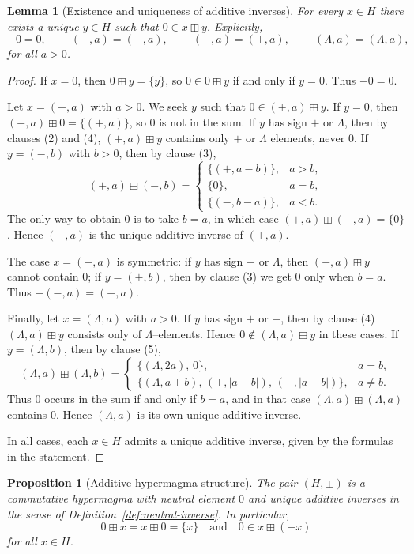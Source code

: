 \documentclass[11pt]{amsart}
\numberwithin{equation}{section}
\newtheorem{proposition}[theorem]{Proposition}
\newtheorem{lemma}[theorem]{Lemma}
\theoremstyle{definition}
\theoremstyle{remark}
\newcommand{\Hnum}{H}                      %
\newcommand{\op}{\boxplus}                 %
\begin{document}
\begin{lemma}[Existence and uniqueness of additive inverses]\label{lem:H-add-inverses}
For every $x\in\Hnum$ there exists a unique $y\in\Hnum$ such that
$0\in x\op y$.  Explicitly,
\[
  -0 = 0,\quad
  -(+,a) = (-,a),\quad
  -(-,a) = (+,a),\quad
  -(\Lambda,a) = (\Lambda,a),
\]
for all $a>0$.
\end{lemma}

\begin{proof}
If $x=0$, then $0\op y=\{y\}$, so $0\in0\op y$ if and only if $y=0$.
Thus $-0=0$.

Let $x=(+,a)$ with $a>0$.  We seek $y$ such that $0\in(+,a)\op y$.
If $y=0$, then $(+,a)\op0=\{(+,a)\}$, so $0$ is not in the sum.  If
$y$ has sign $+$ or $\Lambda$, then by clauses (2) and (4),
$(+,a)\op y$ contains only $+$ or $\Lambda$ elements, never $0$.  If
$y=(-,b)$ with $b>0$, then by clause (3),
\[
  (+,a)\op(-,b)
  =
  \begin{cases}
    \{(+,a-b)\}, & a>b,\\[2pt]
    \{0\},       & a=b,\\[2pt]
    \{(-,b-a)\}, & a<b.
  \end{cases}
\]
The only way to obtain $0$ is to take $b=a$, in which case
$(+,a)\op(-,a)=\{0\}$.  Hence $(-,a)$ is the unique additive inverse
of $(+,a)$.

The case $x=(-,a)$ is symmetric: if $y$ has sign $-$ or $\Lambda$,
then $(-,a)\op y$ cannot contain $0$; if $y=(+,b)$, then by clause (3)
we get $0$ only when $b=a$.  Thus $-(-,a)=(+,a)$.

Finally, let $x=(\Lambda,a)$ with $a>0$.  If $y$ has sign $+$ or $-$,
then by clause (4) $(\Lambda,a)\op y$ consists only of $\Lambda$–elements.
Hence $0\notin(\Lambda,a)\op y$ in these cases.  If $y=(\Lambda,b)$,
then by clause (5),
\[
  (\Lambda,a)\op(\Lambda,b) =
  \begin{cases}
    \{(\Lambda,2a),\,0\}, & a=b,\\[2pt]
    \{(\Lambda,a+b),\, (+,|a-b|),\, (-,|a-b|)\}, & a\ne b.
  \end{cases}
\]
Thus $0$ occurs in the sum if and only if $b=a$, and in that case
$(\Lambda,a)\op(\Lambda,a)$ contains $0$.  Hence $(\Lambda,a)$ is its
own unique additive inverse.

In all cases, each $x\in\Hnum$ admits a unique additive inverse, given
by the formulas in the statement.
\end{proof}

\begin{proposition}[Additive hypermagma structure]\label{prop:H-add-hypermagma}
The pair $(\Hnum,\op)$ is a commutative hypermagma with neutral element
$0$ and unique additive inverses in the sense of
Definition~\ref{def:neutral-inverse}.  In particular,
\[
  0\op x = x\op 0 = \{x\}
  \quad\text{and}\quad
  0\in x\op(-x)
\]
for all $x\in\Hnum$.
\end{proposition}
\end{document}
